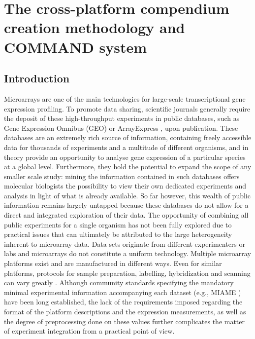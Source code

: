 \chapter{The cross-platform compendium creation methodology and COMMAND 
system}\label{ch:command}


\instructionsintroduction


\section{Introduction}

Microarrays are one of the main technologies for large-scale transcriptional
gene expression profiling.
%
To promote data sharing, scientific journals generally require the deposit of
these high-throughput experiments in public databases, such as Gene Expression
Omnibus (GEO) \cite{Barrett2011} or ArrayExpress \cite{Parkinson2009}, upon
publication.
%
These databases are an extremely rich source of information, containing freely
accessible data for thousands of experiments and a multitude of different
organisms, and in theory provide an opportunity to analyse gene expression of a
particular species at a global level.
%
Furthermore, they hold the potential to expand the scope of any smaller scale
study: mining the information contained in such databases offers molecular
biologists the possibility to view their own dedicated experiments and analysis
in light of what is already available.
%
So far however, this wealth of public information remains largely untapped
because these databases do not allow for a direct and integrated exploration of
their data.
%
The opportunity of combining all public experiments for a single organism has
not been fully explored due to practical issues that can ultimately be
attributed to the large heterogeneity inherent to microarray data.
%
Data sets originate from different experimenters or labs and microarrays do not
constitute a uniform technology.
%
Multiple microarray platforms exist and are manufactured in different
ways.  Even for similar platforms, protocols for sample preparation,
labelling, hybridization and scanning can vary greatly
\cite{Kerr2001,Zakharkin2005}.
%
Although community standards specifying the mandatory minimal experimental
information accompanying each dataset (e.g., MIAME \cite{Brazma2001}) have been
long established, the lack of the requirements \cite{Brazma2009} imposed
regarding the format of the platform descriptions and the expression
measurements, as well as the degree of preprocessing done on these values
further complicates the matter of experiment integration from a practical point
of view.


